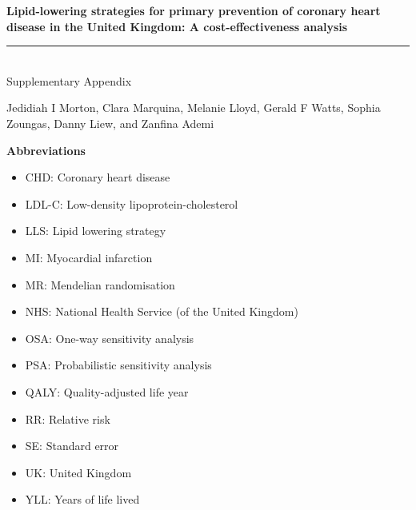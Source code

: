 \documentclass[11pt]{article}
\begin{document}
\begin{titlepage}
    \begin{flushright}
        \Huge
        \textbf{Lipid-lowering strategies for primary prevention of coronary heart disease 
in the United Kingdom: A cost-effectiveness analysis \\}
\color{black}

\rule{16cm}{2mm} \\
\Large
\color{black}
Supplementary Appendix \\
\color{blue}
\color{black}
       \vfill
    \end{flushright}
        \Large
\noindent
Jedidiah I Morton, Clara Marquina, Melanie Lloyd, Gerald F Watts, Sophia Zoungas, Danny Liew, and Zanfina Ademi
\end{titlepage}

\listoftables
\pagebreak
\listoffigures
\pagebreak
\Large
\noindent
\textbf{Abbreviations}
\normalsize

\begin{itemize}
\item CHD: Coronary heart disease
\item LDL-C: Low-density lipoprotein-cholesterol
\item LLS: Lipid lowering strategy
\item MI: Myocardial infarction
\item MR: Mendelian randomisation
\item NHS: National Health Service (of the United Kingdom)
\item OSA: One-way sensitivity analysis
\item PSA: Probabilistic sensitivity analysis
\item QALY: Quality-adjusted life year
\item RR: Relative risk
\item SE: Standard error
\item UK: United Kingdom
\item YLL: Years of life lived
\end{itemize}



\pagebreak
\end{document}
